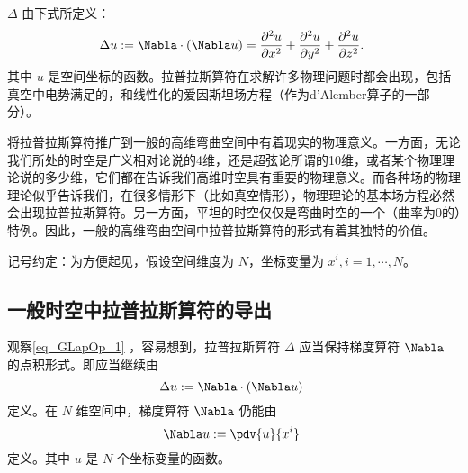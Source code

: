 
 $\Delta$ 由下式所定义：
\begin{equation}\label{eq_GLapOp_1}
\Delta u:=\Nabla\cdot (\Nabla u)=\frac{\partial^{2}{u}}{\partial{x}^{2}} + \frac{\partial^{2}{u}}{\partial{y}^{2}} + \frac{\partial^{2}{u}}{\partial{z}^{2}}.~
\end{equation}
其中 $u$ 是空间坐标的函数。拉普拉斯算符在求解许多物理问题时都会出现，包括真空中电势满足的，和线性化的爱因斯坦场方程（作为d'Alember算子的一部分）。

将拉普拉斯算符推广到一般的高维弯曲空间中有着现实的物理意义。一方面，无论我们所处的时空是广义相对论说的4维，还是超弦论所谓的10维，或者某个物理理论说的多少维，它们都在告诉我们高维时空具有重要的物理意义。而各种场的物理理论似乎告诉我们，在很多情形下（比如真空情形），物理理论的基本场方程必然会出现拉普拉斯算符。另一方面，平坦的时空仅仅是弯曲时空的一个（曲率为0的）特例。因此，一般的高维弯曲空间中拉普拉斯算符的形式有着其独特的价值。

记号约定：为方便起见，假设空间维度为 $N$，坐标变量为 $x^i,i=1,\cdots,N$。

\subsection{一般时空中拉普拉斯算符的导出}
观察\autoref{eq_GLapOp_1} ，容易想到，拉普拉斯算符 $\Delta$ 应当保持梯度算符 $\Nabla$ 的点积形式。即应当继续由
\begin{equation}
\Delta u:=\Nabla\cdot (\Nabla u)~
\end{equation}
定义。在 $N$ 维空间中，梯度算符 $\Nabla$ 仍能由 
\begin{equation}
\Nabla u:=\pdv{u}{x^i}~
\end{equation}
定义。其中 $u$ 是 $N$ 个坐标变量的函数。






